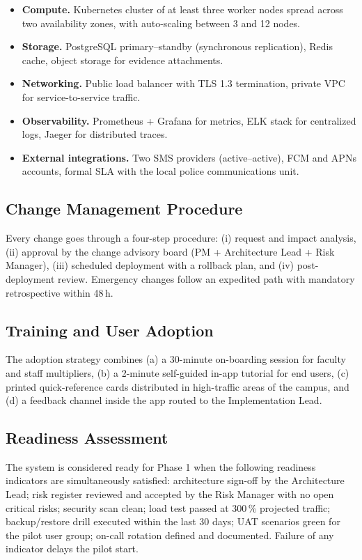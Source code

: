 \documentclass[conference,a4paper,10pt]{IEEEtran}
\begin{document}
\begin{itemize}[leftmargin=*]
  \item \textbf{Compute.} Kubernetes cluster of at least three worker
  nodes spread across two availability zones, with auto-scaling between
  3 and 12 nodes.
  \item \textbf{Storage.} PostgreSQL primary--standby (synchronous
  replication), Redis cache, object storage for evidence attachments.
  \item \textbf{Networking.} Public load balancer with TLS 1.3
  termination, private VPC for service-to-service traffic.
  \item \textbf{Observability.} Prometheus + Grafana for metrics, ELK
  stack for centralized logs, Jaeger for distributed traces.
  \item \textbf{External integrations.} Two SMS providers (active--active),
  FCM and APNs accounts, formal SLA with the local police communications
  unit.
\end{itemize}

\subsection{Change Management Procedure}

Every change goes through a four-step procedure: (i) request and impact
analysis, (ii) approval by the change advisory board (PM +
Architecture Lead + Risk Manager), (iii) scheduled deployment with a
rollback plan, and (iv) post-deployment review. Emergency changes follow
an expedited path with mandatory retrospective within 48\,h.

\subsection{Training and User Adoption}

The adoption strategy combines (a) a 30-minute on-boarding session for
faculty and staff multipliers, (b) a 2-minute self-guided in-app tutorial
for end users, (c) printed quick-reference cards distributed in
high-traffic areas of the campus, and (d) a feedback channel inside the
app routed to the Implementation Lead.

\subsection{Readiness Assessment}

The system is considered ready for Phase 1 when the following readiness
indicators are simultaneously satisfied: architecture sign-off by the
Architecture Lead; risk register reviewed and accepted by the Risk Manager
with no open critical risks; security scan clean; load test passed at
300\,\% projected traffic; backup/restore drill executed within the last
30 days; UAT scenarios green for the pilot user group; on-call rotation
defined and documented. Failure of any indicator delays the pilot start.
\end{document}
